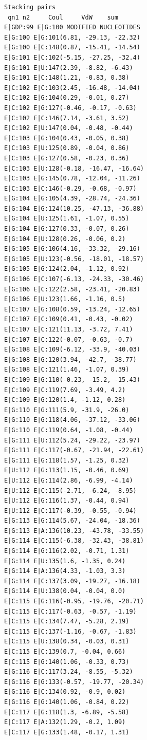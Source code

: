 \documentclass[12pt]{article}
\begin{document}
\begin{appendices}
\begin{scriptsize}
\begin{lstlisting}
Stacking pairs
 qn1 n2     Coul     VdW    sum
E|GDP:99 E|G:100 MODIFIED NUCLEOTIDES
E|G:100 E|G:101(6.81, -29.13, -22.32)
E|G:100 E|C:148(0.87, -15.41, -14.54)
E|G:101 E|C:102(-5.15, -27.25, -32.4)
E|G:101 E|U:147(2.39, -8.82, -6.43)
E|G:101 E|C:148(1.21, -0.83, 0.38)
E|C:102 E|C:103(2.45, -16.48, -14.04)
E|C:102 E|G:104(0.29, -0.01, 0.27)
E|C:102 E|G:127(-0.46, -0.17, -0.63)
E|C:102 E|C:146(7.14, -3.61, 3.52)
E|C:102 E|U:147(0.04, -0.48, -0.44)
E|C:103 E|G:104(0.43, -0.05, 0.38)
E|C:103 E|U:125(0.89, -0.04, 0.86)
E|C:103 E|G:127(0.58, -0.23, 0.36)
E|C:103 E|U:128(-0.18, -16.47, -16.64)
E|C:103 E|G:145(0.78, -12.04, -11.26)
E|C:103 E|C:146(-0.29, -0.68, -0.97)
E|G:104 E|G:105(4.39, -28.74, -24.36)
E|G:104 E|G:124(10.25, -47.13, -36.88)
E|G:104 E|U:125(1.61, -1.07, 0.55)
E|G:104 E|G:127(0.33, -0.07, 0.26)
E|G:104 E|U:128(0.26, -0.06, 0.2)
E|G:105 E|G:106(4.16, -33.32, -29.16)
E|G:105 E|U:123(-0.56, -18.01, -18.57)
E|G:105 E|G:124(2.04, -1.12, 0.92)
E|G:106 E|C:107(-6.13, -24.33, -30.46)
E|G:106 E|C:122(2.58, -23.41, -20.83)
E|G:106 E|U:123(1.66, -1.16, 0.5)
E|C:107 E|G:108(0.59, -13.24, -12.65)
E|C:107 E|C:109(0.41, -0.43, -0.02)
E|C:107 E|C:121(11.13, -3.72, 7.41)
E|C:107 E|C:122(-0.07, -0.63, -0.7)
E|G:108 E|C:109(-6.12, -33.9, -40.03)
E|G:108 E|G:120(3.94, -42.7, -38.77)
E|G:108 E|C:121(1.46, -1.07, 0.39)
E|C:109 E|G:110(-0.23, -15.2, -15.43)
E|C:109 E|C:119(7.69, -3.49, 4.2)
E|C:109 E|G:120(1.4, -1.12, 0.28)
E|G:110 E|G:111(5.9, -31.9, -26.0)
E|G:110 E|G:118(4.06, -37.12, -33.06)
E|G:110 E|C:119(0.64, -1.08, -0.44)
E|G:111 E|U:112(5.24, -29.22, -23.97)
E|G:111 E|C:117(-0.67, -21.94, -22.61)
E|G:111 E|G:118(1.57, -1.25, 0.32)
E|U:112 E|G:113(1.15, -0.46, 0.69)
E|U:112 E|G:114(2.86, -6.99, -4.14)
E|U:112 E|C:115(-2.71, -6.24, -8.95)
E|U:112 E|G:116(1.37, -0.44, 0.94)
E|U:112 E|C:117(-0.39, -0.55, -0.94)
E|G:113 E|G:114(5.67, -24.04, -18.36)
E|G:113 E|A:136(10.23, -43.78, -33.55)
E|G:114 E|C:115(-6.38, -32.43, -38.81)
E|G:114 E|G:116(2.02, -0.71, 1.31)
E|G:114 E|U:135(1.6, -1.35, 0.24)
E|G:114 E|A:136(4.33, -1.03, 3.3)
E|G:114 E|C:137(3.09, -19.27, -16.18)
E|G:114 E|U:138(0.04, -0.04, 0.0)
E|C:115 E|G:116(-0.95, -19.76, -20.71)
E|C:115 E|C:117(-0.63, -0.57, -1.19)
E|C:115 E|C:134(7.47, -5.28, 2.19)
E|C:115 E|C:137(-1.16, -0.67, -1.83)
E|C:115 E|U:138(0.34, -0.03, 0.31)
E|C:115 E|C:139(0.7, -0.04, 0.66)
E|C:115 E|G:140(1.06, -0.33, 0.73)
E|G:116 E|C:117(3.24, -8.55, -5.32)
E|G:116 E|G:133(-0.57, -19.77, -20.34)
E|G:116 E|C:134(0.92, -0.9, 0.02)
E|G:116 E|G:140(1.06, -0.84, 0.22)
E|C:117 E|G:118(1.3, -6.89, -5.58)
E|C:117 E|A:132(1.29, -0.2, 1.09)
E|C:117 E|G:133(1.48, -0.17, 1.31)

\end{lstlisting}
\end{scriptsize}
\end{appendices}
\end{document}
